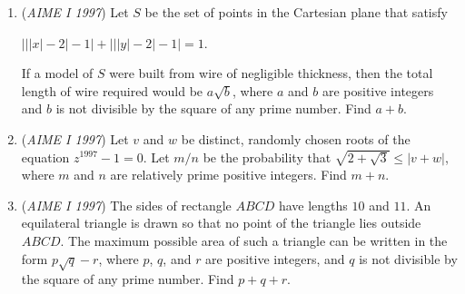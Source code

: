 \begin{enumerate}
 

	\item (\textit{AIME I 1997}) 
Let $S$ be the set of points in the Cartesian plane that satisfy 

 $\Big|\big| |x|-2\big|-1\Big|+\Big|\big| |y|-2\big|-1\Big|=1.$

  If a model of $S$ were built from wire of negligible thickness, then the total length of wire required would be $a\sqrt{b}$, where $a$ and $b$ are positive integers and $b$ is not divisible by the square of any prime number. Find $a+b$.


 

	\item (\textit{AIME I 1997}) Let $v$ and $w$ be distinct, randomly chosen roots of the equation $z^{1997}-1=0$. Let $m/n$ be the probability that $\sqrt{2+\sqrt{3}}\le |v+w|$, where $m$ and $n$ are relatively prime positive integers. Find $m+n$.


 

	\item (\textit{AIME I 1997}) The sides of rectangle $ABCD$ have lengths $10$ and $11$. An equilateral triangle is drawn so that no point of the triangle lies outside $ABCD$. The maximum possible area of such a triangle can be written in the form $p\sqrt{q}-r$, where $p$, $q$, and $r$ are positive integers, and $q$ is not divisible by the square of any prime number. Find $p+q+r$.


 

\end{enumerate}
